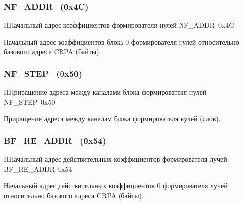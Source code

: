 \subsubsection{NF\_ADDR~ (0x4C)}
\renewcommand{\regnam}{NF\_ADDR~}
\label{sec:NF_ADDR}

\begin{register}{H}{Начальный адрес коэффициентов формирователя нулей \regnam}{0x4C}

\label{regsamplecount}%
%
\regnewline%

\begin{regdesc}\begin{reglist}
\item [NF\_ADDR (rw)]
Начальный адрес коэффициентов блока 0 формирователя нулей относительно базового адреса
CRPA (байты).
\end{reglist}\end{regdesc}
\end{register}

\subsubsection{NF\_STEP~ (0x50)}
\renewcommand{\regnam}{NF\_STEP~}
\label{sec:NF_STEP}

\begin{register}{H}{Приращение адреса между каналами блока формирователя нулей \regnam}{0x50}

\label{regsamplecount}%
%
\regnewline%

\begin{regdesc}\begin{reglist}
\item [NF\_STEP (rw)]
Приращение адреса между каналам блока формирователя нулей (слов).
\end{reglist}\end{regdesc}
\end{register}


\subsubsection{BF\_RE\_ADDR~ (0x54)}
\renewcommand{\regnam}{BF\_RE\_ADDR~}
\label{sec:BF_RE_ADDR}

\begin{register}{H}{Начальный адрес действительных коэффициентов формирователя лучей \regnam}{0x54}

\label{regsamplecount}%
%
\regnewline%

\begin{regdesc}\begin{reglist}
\item [BF\_RE\_ADDR (rw)]
Начальный адрес действительных коэффициентов 0 формирователя лучей относительно базового
адреса CRPA (байты).
\end{reglist}\end{regdesc}
\end{register}

